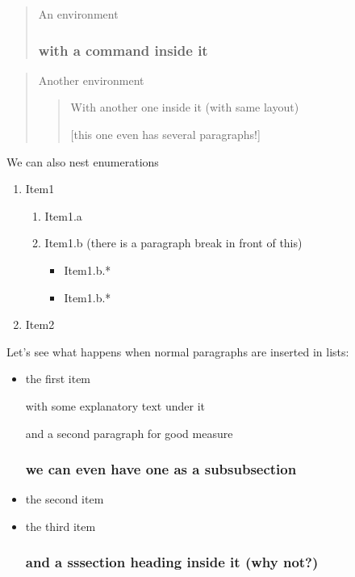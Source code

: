 \documentclass[legalpaper]{article}
\begin{document}
\begin{quotation}
An environment

\subsubsection*{with a command inside it}
\end{quotation}

\begin{quotation}
Another environment

\begin{quotation}
With another one inside it (with same layout)

[this one even has several paragraphs!]
\end{quotation}

\end{quotation}

We can also nest enumerations

\begin{enumerate}
\item Item1
\begin{enumerate}
\item Item1.a

\item Item1.b (there is  a paragraph break in front of this)
\begin{itemize}
\item Item1.b.*
\item Item1.b.*
\end{itemize}
\end{enumerate}
\item Item2
\end{enumerate}

Let's see what happens when normal paragraphs are inserted in lists:

\begin{itemize}
\item the first item

with some explanatory text under it

and a second paragraph for good measure

\subsubsection*{we can even have one as a subsubsection}

\item the second item

\item the third item

\subsubsection*{and a sssection heading inside it (why not?)}
\end{itemize}
\end{document}
